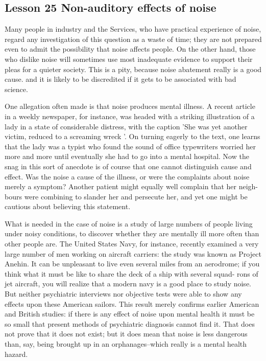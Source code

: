\documentclass[kindlepaper]{BHCexam4kindle}
\begin{document}
\subsection{Lesson 25
Non-auditory effects of noise}
\par
Many people in industry and the Services, who have practical experience of
noise, regard any investigation of this question as a waste of time; they are not
prepared even to admit the possibility that noise affects people. On the other
hand, those who dislike noise will sometimes use most inadequate evidence to
support their pleas for a quieter society. This is a pity, because noise abatement
really is a good cause. and it is likely to be discredited if it gets to be associated
with bad science.
\par
One allegation often made is that noise produces mental illness. A recent article
in a weekly newspaper, for instance, was headed with a striking illustration of a
lady in a state of considerable distress, with the caption 'She was yet another
victim, reduced to a screaming wreck '. On turning eagerly to the text, one learns
that the lady was a typist who found the sound of office typewriters worried her
more and more until eventually she had to go into a mental hospital. Now the
snag in this sort of anecdote is of course that one cannot distinguish cause and
effect. Was the noise a cause of the illness, or were the complaints about noise
merely a symptom? Another patient might equally well complain that her neigh-
bours were combining to slander her and persecute her, and yet one might be
cautious about believing this statement.
\par
What is needed in the case of noise is a study of large numbers of people living
under noisy conditions, to discover whether they are mentally ill more often than
other people are. The United States Navy, for instance, recently examined a very
large number of men working on aircraft carriers: the study was known as
Project Anehin. It can be unpleasant to live even several miles from an aerodrome;
if you think what it must be like to share the deck of a ship with several squad-
rons of jet aircraft, you will realize that a modern navy is a good place to study
noise. But neither psychiatric interviews nor objective tests were able to show
any effects upon these American sailors. This result merely confirms earlier
American and British studies: if there is any effect of noise upon mental health
it must be so small that present methods of psychiatric diagnosis cannot find it.
That does not prove that it does not exist; but it does mean that noise is less
dangerous than, say, being brought up in an orphanages--which really is a mental
health hazard.
\clearpage
\end{document}
